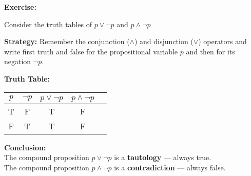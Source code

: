 \begin{center}
\noindent{}
\end{center}
\begin{center}
\noindent{}
\end{center}
\begin{center}
\noindent{}
\end{center}

\begin{tcolorbox}[title=Example 1: Examples of tautologies and contradictions using just one propositional variable]
\textbf{Exercise:}  
\begin{center}
Consider the truth tables of $p\lor \neg p$ and $p \land \neg p$ 
\end{center}

\textbf{Strategy:}  
Remember the conjunction ($\land$) and disjunction ($\lor$) operators and write first truth and false for the propositional variable $p$ and then for its negation $\neg p$.

\vspace{5pt}
\textbf{Truth Table:}
\begin{center}
\begin{tabular}{|c!{\vrule width 1pt}c|c!{\vrule width 1.5pt}c|c|}
\hline
{}
\textbf{$p$} & \textbf{$\neg p$} & \textbf{$p \lor \neg p$} & \textbf{$p \land \neg p$} \\
\hline
T & F & T & F \\
F & T & T & F \\
\hline
\end{tabular}
\end{center}

\vspace{5pt}
\textbf{Conclusion:}   \\
The compound proposition $p \lor \neg p$ is a \textbf{tautology} — always true. \\
The compound proposition $p \land \neg p$ is a \textbf{contradiction} — always false.
\end{tcolorbox}





